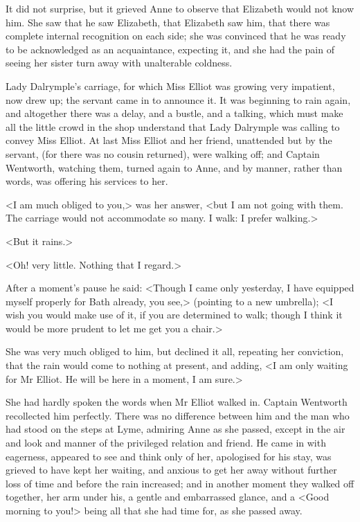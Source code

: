 It did not surprise, but it grieved Anne to observe that Elizabeth would not know him. She saw that he saw Elizabeth, that Elizabeth saw him, that there was complete internal recognition on each side; she was convinced that he was ready to be acknowledged as an acquaintance, expecting it, and she had the pain of seeing her sister turn away with unalterable coldness.

Lady Dalrymple's carriage, for which Miss Elliot was growing very impatient, now drew up; the servant came in to announce it. It was beginning to rain again, and altogether there was a delay, and a bustle, and a talking, which must make all the little crowd in the shop understand that Lady Dalrymple was calling to convey Miss Elliot. At last Miss Elliot and her friend, unattended but by the servant, (for there was no cousin returned), were walking off; and Captain Wentworth, watching them, turned again to Anne, and by manner, rather than words, was offering his services to her.

<I am much obliged to you,> was her answer, <but I am not going with them. The carriage would not accommodate so many. I walk: I prefer walking.>

<But it rains.>

<Oh! very little. Nothing that I regard.>

After a moment's pause he said: <Though I came only yesterday, I have equipped myself properly for Bath already, you see,> (pointing to a new umbrella); <I wish you would make use of it, if you are determined to walk; though I think it would be more prudent to let me get you a chair.>

She was very much obliged to him, but declined it all, repeating her conviction, that the rain would come to nothing at present, and adding, <I am only waiting for Mr Elliot. He will be here in a moment, I am sure.>

She had hardly spoken the words when Mr Elliot walked in. Captain Wentworth recollected him perfectly. There was no difference between him and the man who had stood on the steps at Lyme, admiring Anne as she passed, except in the air and look and manner of the privileged relation and friend. He came in with eagerness, appeared to see and think only of her, apologised for his stay, was grieved to have kept her waiting, and anxious to get her away without further loss of time and before the rain increased; and in another moment they walked off together, her arm under his, a gentle and embarrassed glance, and a <Good morning to you!> being all that she had time for, as she passed away.

